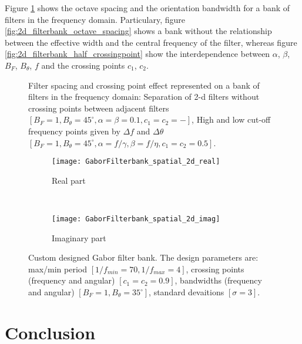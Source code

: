 Figure \ref{fig:2d_filterbank_spacing} shows the octave spacing and the orientation bandwidth for a bank of filters in the frequency domain. Particulary, figure \ref{fig:2d_filterbank_octave_spacing} shows a bank without the relationship between the effective width and the central frequency of the filter, whereas figure \ref{fig:2d_filterbank_half_crossingpoint} show the interdependence between $\alpha$, $\beta$, $B_F$, $B_{\theta}$, $f$ and the crossing points $c_1$, $c_2$.

\begin{figure}[!ht]
\centering
\caption{Filter spacing and crossing point effect represented on a bank of filters in the frequency domain:  Separation of 2-d filters without crossing points between adjacent filters $[B_F=1, B_{\theta} = 45^{\circ}, \alpha=\beta=0.1, c_1=c_2=-]$,  High and low cut-off frequency points given by $\Delta f$ and $\Delta \theta$ $[B_F=1, B_{\theta} = 45^{\circ}, \alpha=f/\gamma, \beta=f/\eta, c_1=c_2=0.5]$.}\label{fig:2d_filterbank_spacing}
\end{figure}

\begin{figure}[!ht]
	\centering
	\begin{subfigure}[b]{0.8\textwidth}
		\texttt{[image: GaborFilterbank\_spatial\_2d\_real]}
		\caption{Real part}
		\label{fig:2d_filterbank_real}
	\end{subfigure}\\
	\begin{subfigure}[b]{0.8\textwidth}
		\centering
		\texttt{[image: GaborFilterbank\_spatial\_2d\_imag]}
		\caption{Imaginary part}
		\label{fig:2d_filterbank_imag}
	\end{subfigure}
	    
    \caption{Custom designed Gabor filter bank. The design parameters are: max/min period $[1/f_{min}=70, 1/f_{max}=4]$, crossing points (frequency and angular) $[c_1=c_2= 0.9]$, bandwidths (frequency and angular) $[B_F=1, B_{\theta} = 35^{\circ}]$, standard devaitions $[\sigma=3]$.}\label{fig:2d_filterbank}
\end{figure}

\section{Conclusion}

